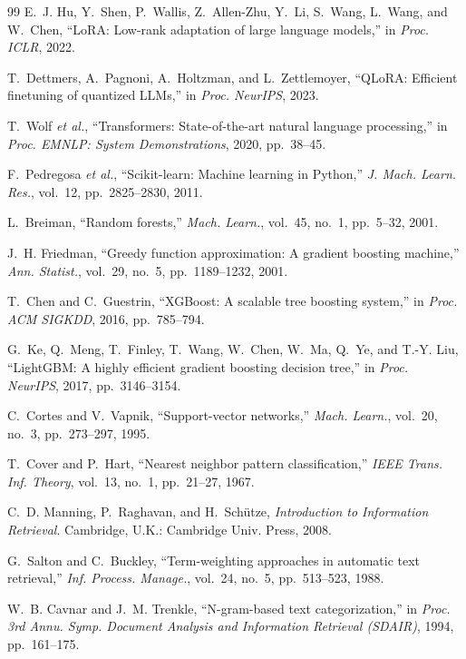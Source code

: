 \documentclass[10pt,journal]{IEEEtran}
\begin{document}
\begin{thebibliography}{99}
E.~J. Hu, Y.~Shen, P.~Wallis, Z.~Allen-Zhu, Y.~Li, S.~Wang, L.~Wang, and W.~Chen, ``LoRA: Low-rank adaptation of large language models,'' in \emph{Proc. ICLR}, 2022.

T.~Dettmers, A.~Pagnoni, A.~Holtzman, and L.~Zettlemoyer, ``QLoRA: Efficient finetuning of quantized LLMs,'' in \emph{Proc. NeurIPS}, 2023.

T.~Wolf \emph{et al.}, ``Transformers: State-of-the-art natural language processing,'' in \emph{Proc. EMNLP: System Demonstrations}, 2020, pp.~38--45.

F.~Pedregosa \emph{et al.}, ``Scikit-learn: Machine learning in Python,'' \emph{J. Mach. Learn. Res.}, vol.~12, pp.~2825--2830, 2011.

L.~Breiman, ``Random forests,'' \emph{Mach. Learn.}, vol.~45, no.~1, pp.~5--32, 2001.

J.~H. Friedman, ``Greedy function approximation: A gradient boosting machine,'' \emph{Ann. Statist.}, vol.~29, no.~5, pp.~1189--1232, 2001.

T.~Chen and C.~Guestrin, ``XGBoost: A scalable tree boosting system,'' in \emph{Proc. ACM SIGKDD}, 2016, pp.~785--794.

G.~Ke, Q.~Meng, T.~Finley, T.~Wang, W.~Chen, W.~Ma, Q.~Ye, and T.-Y. Liu, ``LightGBM: A highly efficient gradient boosting decision tree,'' in \emph{Proc. NeurIPS}, 2017, pp.~3146--3154.

C.~Cortes and V.~Vapnik, ``Support-vector networks,'' \emph{Mach. Learn.}, vol.~20, no.~3, pp.~273--297, 1995.

T.~Cover and P.~Hart, ``Nearest neighbor pattern classification,'' \emph{IEEE Trans. Inf. Theory}, vol.~13, no.~1, pp.~21--27, 1967.

C.~D. Manning, P.~Raghavan, and H.~Sch\"utze, \emph{Introduction to Information Retrieval}. Cambridge, U.K.: Cambridge Univ. Press, 2008.

G.~Salton and C.~Buckley, ``Term-weighting approaches in automatic text retrieval,'' \emph{Inf. Process. Manage.}, vol.~24, no.~5, pp.~513--523, 1988.

W.~B. Cavnar and J.~M. Trenkle, ``N-gram-based text categorization,'' in \emph{Proc. 3rd Annu. Symp. Document Analysis and Information Retrieval (SDAIR)}, 1994, pp.~161--175.


\end{thebibliography}
\end{document}

